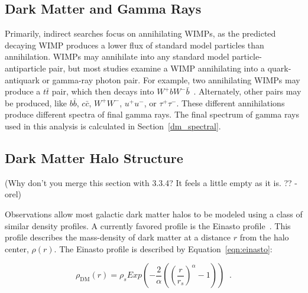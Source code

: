   \subsection{Dark Matter and Gamma Rays}
    Primarily, indirect searches focus on annihilating WIMPs, as the predicted decaying WIMP produces a lower flux of standard model particles than annihilation.
    WIMPs may annihilate into any standard model particle-antiparticle pair, but most studies examine a WIMP annihilating into a quark-antiquark or gamma-ray photon pair.
    For example, two annihilating WIMPs may produce a $t\bar{t}$ pair, which then decays into $W^+bW^-\bar{b}$~\cite{pdg2016}.
    Alternately, other pairs may be produced, like  $b\bar{b}$, $c\bar{c}$, $W^+W^-$, $u^+u^-$, or $\tau^+\tau^-$.
    These different annihilations produce different spectra of final gamma rays.
    The final spectrum of gamma rays used in this analysis is calculated in Section~\ref{dm_spectral}.
  
  \subsection{Dark Matter Halo Structure}\label{dm_spatial}
    
    {\color{red}(Why don't you merge this section with 3.3.4? It feels a little empty as it is. ?? -orel)}
    
    Observations allow most galactic dark matter halos to be modeled using a class of similar density profiles.
    A currently favored profile is the Einasto profile~\cite{einastoprofile1,einastoprofile2}.
    This profile describes the mass-density of dark matter at a distance $r$ from the halo center, $\rho(r)$.
    The Einasto profile is described by Equation~\ref{eqn:einasto}:

    \begin{equation} \label{eqn:einasto}
      \rho_{\textrm{DM}} \left( r \right) = \rho_{s} Exp \left( - \frac{2}{\alpha} \left( {\left( \frac{r}{r_s} \right)}^{\alpha} - 1 \right) \right) \;\; .
    \end{equation}
    
